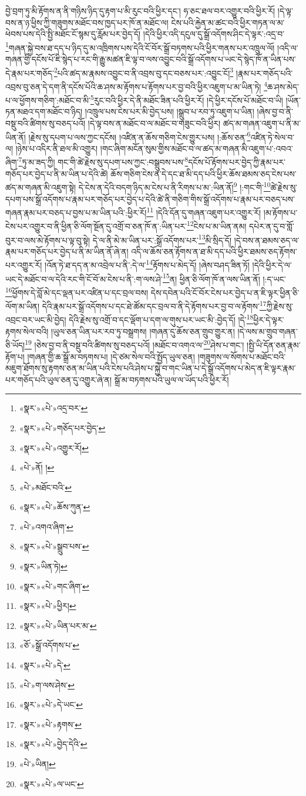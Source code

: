བྱེ་བྲག་ཏུ་མི་རྟོགས་ན་ནི་གཉིས་ཉིད་དུ་རྟག་པ་མི་རུང་བའི་ཕྱིར་དང་། ཧ་ཅང་ཐལ་བར་འགྱུར་བའི་ཕྱིར་རོ། །དེ་ལྟ་བས་ན་ཉ་ཕྱིས་ཀྱི་གཟུགས་མཐོང་བས་ཁྱད་པར་ཁོ་ན་མཐོང་ལ། ངེས་པའི་རྐྱེན་མ་ཚང་བའི་ཕྱིར་གཏན་ལ་མ་ཕེབས་པས་དེའི་སྤྱི་མཐོང་ངོ་སྙམ་དུ་རློམ་པར་བྱེད་དོ། །དེའི་ཕྱིར་འདི་དངུལ་དུ་སྒྲོ་འདོགས་ཤིང་དེ་ལྟར་:འདྲ་བ་\footnote{«སྣར་»«པེ་»འདྲ་བར་}གཞན་སྐྱེ་བས་ཐ་དད་པ་ཉིད་དུ་མ་འཁྲིགས་པས་དེའི་ངོ་བོར་སྒྲོ་བཏགས་པའི་ཕྱིར་གནས་པར་འཁྲུལ་ལོ། །འདི་ལ་གཞན་གྱི་དངོས་པོ་ཇི་སྙེད་པ་རང་གི་རྒྱུ་མཚན་ཇི་ལྟ་བ་ལས་འབྱུང་བའི་སྒྲོ་འདོགས་པ་ཡང་དེ་སྙེད་ཁོ་ན་ཡིན་པས་དེ་རྣམ་པར་གཅོད་\footnote{«སྣར་»«པེ་»གཅོད་པར་བྱེད་}པའི་ཚད་མ་རྣམས་འབྱུང་བ་ནི་འབྲས་བུ་དང་བཅས་པར་:འབྱུང་ངོ།\footnote{«སྣར་»«པེ་»འགྱུར་རོ།} །རྣམ་པར་གཅོད་པའི་འབྲས་བུ་ཅན་དེ་དག་ནི་དངོས་པོའི་ཆ་ཤས་མ་རྟོགས་པ་རྟོགས་པར་བྱ་བའི་ཕྱིར་འཇུག་པ་མ་ཡིན་ཏེ། \footnote{«པེ་»ནོ། ། }ཆ་ཤས་མེད་པ་ལ་ཕྱོགས་གཅིག་:མཐོང་བ་མི་\footnote{«པེ་»མཐོང་བའི་}རུང་བའི་ཕྱིར་དེ་ནི་མཐོང་ཟིན་པའི་ཕྱིར་རོ། །དེ་ཕྱིར་དངོས་པོ་མཐོང་བ་ཡི། །ཡོན་ཏན་མཐའ་དག་མཐོང་བ་ཉིད། །འཁྲུལ་པས་ངེས་པར་མི་བྱེད་པས། །སྒྲུབ་པ་རབ་ཏུ་འཇུག་པ་ཡིན། །ཞེས་བྱ་བ་ནི་བསྡུ་བའི་ཚིགས་སུ་བཅད་པའོ། །དེ་ལྟ་བས་ན་མཐོང་བ་ལ་མཐོང་བ་གཟུང་བའི་ཕྱིར། ཚད་མ་གཞན་འཇུག་པ་ནི་མ་ཡིན་ནོ། །རྗེས་སུ་དཔག་པ་ལས་ཀྱང་དངོས། །འཛིན་ན་ཆོས་གཅིག་ངེས་གྱུར་པས། །:ཆོས་ཅན་\footnote{«སྣར་»«པེ་»ཆོས་ཀུན་}འཛིན་ཏེ་སེལ་བ་ལ། །ཉེས་པ་འདིར་ནི་ཐལ་མི་འགྱུར། །གང་ཞིག་མངོན་སུམ་གྱིས་མཐོང་བ་ལ་ཚད་མ་གཞན་མི་འཇུག་པ་:འབའ་ཞིག་\footnote{«པེ་»འགའ་ཞིག་}ཏུ་མ་ཟད་ཀྱི། གང་གི་ཚེ་རྗེས་སུ་དཔག་པས་ཀྱང་:བསྒྲུབས་པས་\footnote{«སྣར་»«པེ་»སྒྲུབ་པས་}དངོས་པོ་རྟོགས་པར་བྱེད་ཀྱི་རྣམ་པར་གཅོད་པར་བྱེད་པ་ནི་མ་ཡིན་པ་དེའི་ཚེ། ཆོས་གཅིག་ངེས་ན་དེ་དང་ཐ་མི་དད་པའི་ཕྱིར་ཆོས་ཐམས་ཅད་ངེས་པས་ཚད་མ་གཞན་མི་འཇུག་སྟེ། དེ་ངེས་ན་དེའི་བདག་ཉིད་མ་ངེས་པ་ནི་རིགས་པ་མ་:ཡིན་ནོ།\footnote{«སྣར་»ཡིན་ཏེ།} །:གང་གི་\footnote{«སྣར་»«པེ་»གང་ཞིག་}ཚེ་རྗེས་སུ་དཔག་པས་སྒྲོ་འདོགས་པ་རྣམ་པར་གཅོད་པར་བྱེད་པ་དེའི་ཚེ་ནི་གཅིག་གིས་སྒྲོ་འདོགས་པ་རྣམ་པར་བཅད་པས་གཞན་རྣམ་པར་བཅད་པ་བྱས་པ་མ་ཡིན་པའི་:ཕྱིར་རོ།\footnote{«སྣར་»«པེ་»ཕྱིར།} །དེའི་དོན་དུ་གཞན་འཇུག་པར་འགྱུར་རོ། །མ་རྟོགས་པ་ངེས་པར་འགྱུར་བ་ནི་ཕྱིན་ཅི་ལོག་སྔོན་དུ་འགྲོ་བ་ཅན་ཁོ་ན་:ཡིན་པར་\footnote{«སྣར་»«པེ་»ཡིན་པར་མ་}ངེས་པ་མ་ཡིན་ནམ། དཔེར་ན་དུ་བ་གློ་བུར་བ་ལས་མེ་རྟོགས་པ་ལྟ་བུ་སྟེ། དེ་ལ་ནི་མེ་མ་ཡིན་པར་:སྒྲོ་འདོགས་པར་\footnote{«ཅོ་»སྒྲོ་འདོགས་པ་}མི་སྲིད་དོ། །དེ་བས་ན་ཐམས་ཅད་ལ་རྣམ་པར་གཅོད་པར་བྱེད་པ་ནི་མ་ཡིན་ནོ་ཞེ་ན། འདི་ལ་ཆོས་ཅན་རྟོགས་ན་ཐ་མི་དད་པའི་ཕྱིར་ཐམས་ཅད་རྟོགས་པར་འགྱུར་རོ། །འོན་ཏེ་ཐ་དད་ན་མ་འབྲེལ་པ་ནི་:དེ་ལ་\footnote{«སྣར་»«པེ་»དེ་}རྟོགས་པ་མེད་དོ། །ཞེས་བཤད་ཟིན་ཏོ། །དེའི་ཕྱིར་དེ་ལ་ཡང་དེ་མཐོང་བ་ལ་དེའི་རང་གི་ངོ་བོ་མ་ངེས་པ་ནི་:ག་ལས་ཤེ་\footnote{«པེ་»ག་ལས་ཤེས་}ན། ཕྱིན་ཅི་ལོག་ཁོ་ན་ལས་ཡིན་ནོ། །:ད་ཡང་\footnote{«སྣར་»«པེ་»དེ་ཡང་}ཕྱོགས་དེ་བློ་མེ་དང་ལྡན་པར་འཛིན་པ་དང་བྲལ་བས། དེས་དབེན་པའི་ངོ་བོར་ངེས་པར་བྱེད་པ་ན་ཇི་ལྟར་ཕྱིན་ཅི་ལོག་མ་ཡིན། དེའི་རྣམ་པར་སྒྲོ་འདོགས་པ་དང་ཐེ་ཚོམ་དང་བྲལ་བ་ནི་དེ་རྟོགས་པར་བྱ་བ་ལ་རྟོགས་\footnote{«སྣར་»«པེ་»རྟགས་}ཀྱི་རྗེས་སུ་འབྲང་བར་ཡང་མི་བྱེད། དེའི་རྗེས་སུ་འགྲོ་བ་དང་ལྡོག་པ་དག་ལ་གུས་པར་ཡང་མི་:བྱེད་དོ། །དེ་\footnote{«སྣར་»«པེ་»བྱེད་དེའི་}ཕྱིར་དེ་ལྟར་རྟགས་སེལ་བའི། །ཡུལ་ཅན་ཡིན་པར་རབ་ཏུ་བསྒྲགས། །གཞན་དུ་ཆོས་ཅན་གྲུབ་གྱུར་ན། །དེ་ལས་མ་གྲུབ་གཞན་ཅི་ཡོད།\footnote{«པེ་»ཡིན།} །ཅེས་བྱ་བ་ནི་བསྡུ་བའི་ཚིགས་སུ་བཅད་པའོ། །མཐོང་བ་འགའ་ལ་\footnote{«སྣར་»«པེ་»ལ་ཡང་}ཤེས་པ་གང་། །སྤྱི་ཡི་དོན་ཅན་རྣམ་རྟོག་པ། །གཞན་གྱི་ཆ་སྒྲོ་མ་བཏགས་པ། །དེ་ཙམ་སེལ་བའི་སྤྱོད་ཡུལ་ཅན། །གཟུགས་ལ་སོགས་པ་མཐོང་བའི་མཇུག་ཐོགས་སུ་རྟགས་ཅན་མ་ཡིན་པའི་ངེས་པའི་ཤེས་པ་སྐྱེ་བ་གང་ཡིན་པ་དེ་སྒྲོ་འདོགས་པ་མེད་ན་ཇི་ལྟར་རྣམ་པར་གཅོད་པའི་ཡུལ་ཅན་དུ་འགྱུར་ཞེ་ན། སྒྲོ་མ་བཏགས་པའི་ཡུལ་ལ་ཡོད་པའི་ཕྱིར་རོ། 